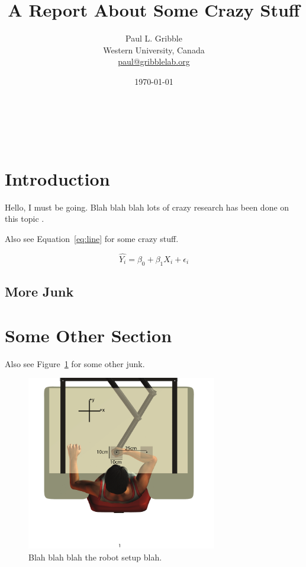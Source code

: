 \documentclass[letterpaper,titlepage,12pt]{article}
\title{A Report About Some Crazy Stuff}
\author{Paul L. Gribble\\Western University, Canada\\{\small \url{paul@gribblelab.org}}}
\date{\today}
\makeatletter
\renewcommand{\maketitle}{
\begin{flushleft}          %
{\LARGE\@title}            %
\vspace{20pt}\\            %
{\large\@author}           %
\\\@date                   %
\vspace{20pt}              %
\end{flushleft}
}
\makeatother
\begin{document}
\maketitle
\thispagestyle{empty}

\section{Introduction}

Hello, I must be going. Blah blah blah lots of crazy research has been done on this topic \citep{Mattar:2005}.

\lipsum[1]

Also see Equation~\ref{eq:line} for some crazy stuff.

\begin{equation}
\hat{Y_{i}} = \beta_{0} + \beta_{1} X_{i} + \epsilon_{i}
\label{eq:line}
\end{equation}

\subsection{More Junk}

\lipsum[1-3]

\section{Some Other Section}

Also see Figure~\ref{fig:setupfig} for some other junk.

\begin{figure}[H]
	\centering
    \includegraphics[height=3in]{figure1.pdf}
 \caption{Blah blah blah the robot setup blah.}
 \label{fig:setupfig}
\end{figure}

\lipsum[1-4]
\end{document}

